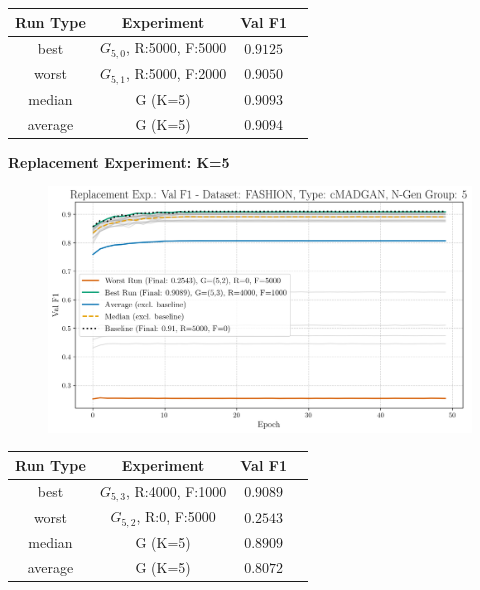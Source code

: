 \begin{table}[H]
	\vspace{-1em}
	\centering
	\begin{tabular}{|c|c|c|c|}
		\hline
		Run Type & Experiment & Val F1 \\ \hline
		best & \(G_{5, 0}\), R:5000, F:5000 & $0.9125$\\ \hline
		worst & \(G_{5, 1}\), R:5000, F:2000 & $0.9050$\\ \hline
		median & G (K=5) & $0.9093$\\ \hline
		average & G (K=5) & $0.9094$
		\\ \hline
	\end{tabular}
\end{table}
\noindent\textbf{Replacement Experiment: K=5}
\begin{figure}[htbp]
	\centering
	\includegraphics[width=.85\textwidth]{abb/strat_classifier_performance/FASHION_STRATIFIED_CLASSIFIERS_cMADGAN_NEW/replacement_experiments/val_f1_score_cMADGAN_FASHION_n_gen_5_all.png}
	\label{fig:app_strat_class_performance_replacement_exp._val_f1_score_5}
\end{figure}
\begin{table}[H]
	\vspace{-1em}
	\centering
	\begin{tabular}{|c|c|c|c|}
		\hline
		Run Type & Experiment & Val F1 \\ \hline
		best & \(G_{5, 3}\), R:4000, F:1000 & $0.9089$\\ \hline
		worst & \(G_{5, 2}\), R:0, F:5000 & $0.2543$\\ \hline
		median & G (K=5) & $0.8909$\\ \hline
		average & G (K=5) & $0.8072$
		\\ \hline
	\end{tabular}
\end{table}
